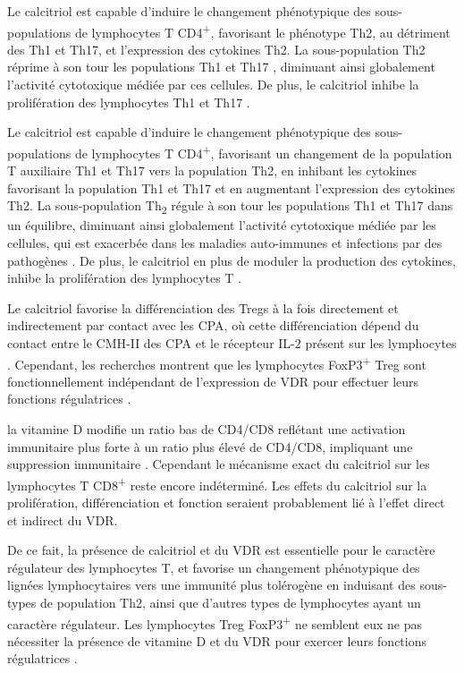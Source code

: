 \documentclass[
  a4paper,
  DIV=11,
  numbers=noendperiod,
  listof=totoc]{scrreprt}
\begin{document}
Le calcitriol est capable d'induire le changement phénotypique des
sous-populations de lymphocytes T CD4\textsuperscript{+}, favorisant le
phénotype \ac{Th2}, au détriment des \ac{Th1} et \ac{Th17}, et
l'expression des cytokines \ac{Th2.} La sous-population \ac{Th2} réprime
à son tour les populations \ac{Th1} et \ac{Th17}
\autocite{Meza-Meza.2022}, diminuant ainsi globalement l'activité
cytotoxique médiée par ces cellules. De plus, le calcitriol inhibe la
prolifération des lymphocytes Th1 et Th17 \autocite{Cantorna.2015}.

Le calcitriol est capable d'induire le changement phénotypique des
sous-populations de lymphocytes T CD4\textsuperscript{+}, favorisant un
changement de la population T auxiliaire \ac{Th1} et \ac{Th17} vers la
population \ac{Th2}, en inhibant les cytokines favorisant la population
\ac{Th1} et \ac{Th17} et en augmentant l'expression des cytokines
\ac{Th2}. La sous-population Th\textsubscript{2} régule à son tour les
populations \ac{Th1} et \ac{Th17} dans un équilibre, diminuant ainsi
globalement l'activité cytotoxique médiée par les cellules, qui est
exacerbée dans les maladies auto-immunes et infections par des
pathogènes \autocite{Meza-Meza.2022}. De plus, le calcitriol en plus de
moduler la production des cytokines, inhibe la prolifération des
lymphocytes T \autocite{Cantorna.2015}.

Le calcitriol favorise la différenciation des \acp{Treg} à la fois
directement et indirectement par contact avec les \ac{CPA}, où cette
différenciation dépend du contact entre le \ac{CMH-II} des \ac{CPA} et
le récepteur \ac{IL-2} présent sur les lymphocytes
\autocite{Charoenngam.2020}. Cependant, les recherches montrent que les
lymphocytes FoxP3\textsuperscript{+} \ac{Treg} sont fonctionnellement
indépendant de l'expression de VDR pour effectuer leurs fonctions
régulatrices \autocite{Cantorna.2010}.

la vitamine D modifie un ratio bas de CD4/CD8 reflétant une activation
immunitaire plus forte à un ratio plus élevé de CD4/CD8, impliquant une
suppression immunitaire \autocite{Charoenngam.2020}. Cependant le
mécanisme exact du calcitriol sur les lymphocytes T
CD8\textsuperscript{+} reste encore indéterminé. Les effets du
calcitriol sur la prolifération, différenciation et fonction seraient
probablement lié à l'effet direct et indirect du VDR.

De ce fait, la présence de calcitriol et du \ac{VDR} est essentielle
pour le caractère régulateur des lymphocytes T, et favorise un
changement phénotypique des lignées lymphocytaires vers une immunité
plus tolérogène en induisant des sous-types de population \ac{Th2},
ainsi que d'autres types de lymphocytes ayant un caractère régulateur.
Les lymphocytes \ac{Treg} FoxP3\textsuperscript{+} ne semblent eux ne
pas nécessiter la présence de vitamine D et du \ac{VDR} pour exercer
leurs fonctions régulatrices \autocite{Cantorna.2010}.
\end{document}

